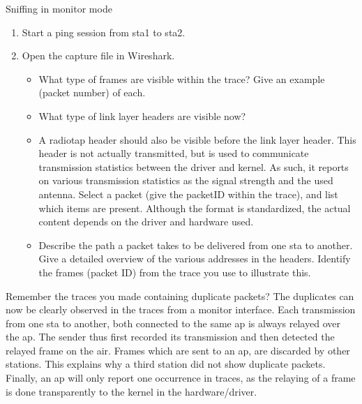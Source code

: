 \begin{exercise}{Sniffing in monitor mode}
\begin{enumerate}
	\item Start a ping session from \ac{sta}1 to \ac{sta}2. \label{ex:3-4}\newline
	\item Open the capture file in Wireshark. 
	\begin{itemize}
		\item What type of frames are visible within the trace? Give an example (packet number) of each. \newline
		\begin{esolution}
		\end{esolution}
		\item What type of link layer headers  are visible now?\newline
		\begin{esolution}
		\end{esolution}
		\item A radiotap header should also be visible before the link layer header. This header is not actually transmitted, but is used to communicate transmission statistics between the driver and kernel. As such, it reports on various transmission statistics as the signal strength and the used antenna. Select a packet (give the packetID within the trace), and list which items are present. Although the format is standardized, the actual content depends on the driver and hardware used.\newline
		\begin{esolution}
		\end{esolution}
		\item Describe the path a packet takes to be delivered from one \acl{sta} to another. Give a detailed overview of the various addresses in the headers. Identify the frames (packet ID) from the trace you use to illustrate this.\newline
		\begin{esolution}
		\end{esolution}
	\end{itemize}
\end{enumerate}
\end{exercise}


Remember the traces you made containing duplicate packets? The duplicates can now be clearly observed in the traces from a monitor interface. Each transmission from one \acl{sta} to another, both connected to the same \ac{ap} is always relayed over the \ac{ap}. The sender thus first recorded its transmission and then detected the relayed frame on the air. Frames which are sent to an \ac{ap}, are discarded by other stations. This explains why a third station did not show duplicate packets. Finally, an \acl{ap} will only report one occurrence in  traces, as the relaying of a frame is done transparently to the kernel in the hardware/driver.



